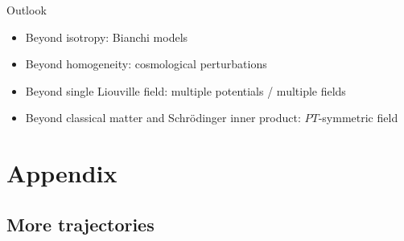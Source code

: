 \documentclass[8pt]{beamer}
\begin{document}

\begin{frame}%
{Outlook}%
\begin{itemize}
\item Beyond isotropy: Bianchi models

\item Beyond homogeneity: cosmological perturbations

\item Beyond single Liouville field: multiple potentials / multiple fields

\item Beyond classical matter and Schrödinger inner product: $PT$-symmetric 
field

\end{itemize}
\end{frame}


\section*{Appendix}

\subsection*{More trajectories}
\end{document}
